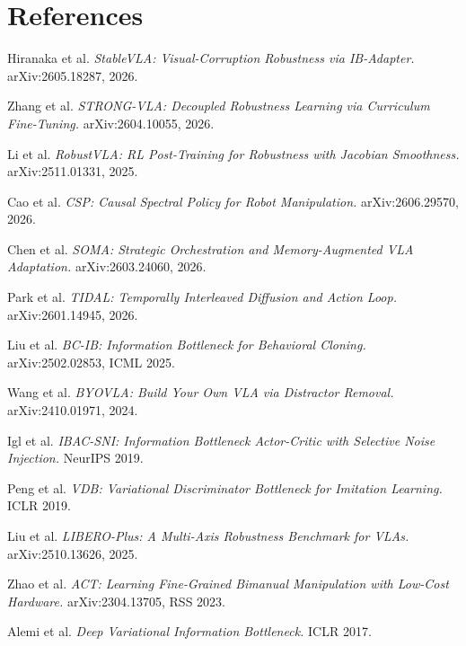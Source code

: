\documentclass[11pt,a4paper]{article}
\begin{document}
\section*{References}
\begingroup
\small
\begin{enumerate}[label={[\arabic*]},leftmargin=2em]
  \item Hiranaka et al. \textit{StableVLA: Visual-Corruption Robustness via IB-Adapter.}
        arXiv:2605.18287, 2026.
  \item Zhang et al. \textit{STRONG-VLA: Decoupled Robustness Learning via Curriculum Fine-Tuning.}
        arXiv:2604.10055, 2026.
  \item Li et al. \textit{RobustVLA: RL Post-Training for Robustness with Jacobian Smoothness.}
        arXiv:2511.01331, 2025.
  \item Cao et al. \textit{CSP: Causal Spectral Policy for Robot Manipulation.}
        arXiv:2606.29570, 2026.
  \item Chen et al. \textit{SOMA: Strategic Orchestration and Memory-Augmented VLA Adaptation.}
        arXiv:2603.24060, 2026.
  \item Park et al. \textit{TIDAL: Temporally Interleaved Diffusion and Action Loop.}
        arXiv:2601.14945, 2026.
  \item Liu et al. \textit{BC-IB: Information Bottleneck for Behavioral Cloning.}
        arXiv:2502.02853, ICML 2025.
  \item Wang et al. \textit{BYOVLA: Build Your Own VLA via Distractor Removal.}
        arXiv:2410.01971, 2024.
  \item Igl et al. \textit{IBAC-SNI: Information Bottleneck Actor-Critic with Selective Noise Injection.}
        NeurIPS 2019.
  \item Peng et al. \textit{VDB: Variational Discriminator Bottleneck for Imitation Learning.}
        ICLR 2019.
  \item Liu et al. \textit{LIBERO-Plus: A Multi-Axis Robustness Benchmark for VLAs.}
        arXiv:2510.13626, 2025.
  \item Zhao et al. \textit{ACT: Learning Fine-Grained Bimanual Manipulation with Low-Cost Hardware.}
        arXiv:2304.13705, RSS 2023.
  \item Alemi et al. \textit{Deep Variational Information Bottleneck.} ICLR 2017.
\end{enumerate}
\endgroup
\end{document}
